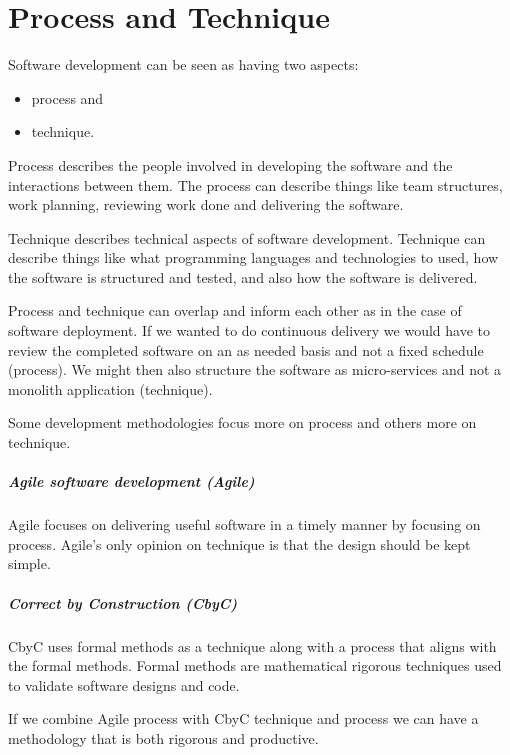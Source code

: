 
\chapter{Process and Technique} %

\label{Chapter_ Process_and_Technique} %


Software development can be seen as having two aspects: 
\begin{itemize}
	\item process and 
	\item technique.
\end{itemize}

Process describes the people involved in developing the software and the 
interactions between them. The process can describe things like team 
structures, work planning, reviewing work done and delivering the software. 

Technique describes technical aspects of software development. Technique can 
describe things like what programming languages and technologies to used, 
how the software is structured and tested, and also how the software is delivered. 

Process and technique can overlap and inform each other as in the case of software
deployment. If we wanted to do continuous delivery we would have to review 
the completed software on an as needed basis and not a fixed schedule (process). 
We might then also structure the software as micro-services and not a monolith 
application (technique).

Some development methodologies focus more on process and others more on technique.

\paragraph*{Agile software development (Agile)}
Agile focuses on delivering useful software in a timely manner by focusing on process.
Agile's only opinion on technique is that the design should be kept simple.

\paragraph*{Correct by Construction (CbyC)}
CbyC uses formal methods as a technique along with a process that 
aligns with the formal methods. Formal methods are mathematical rigorous techniques
used to validate software designs and code.

If we combine Agile process with CbyC technique and process
we can have a methodology that is both rigorous and productive.
